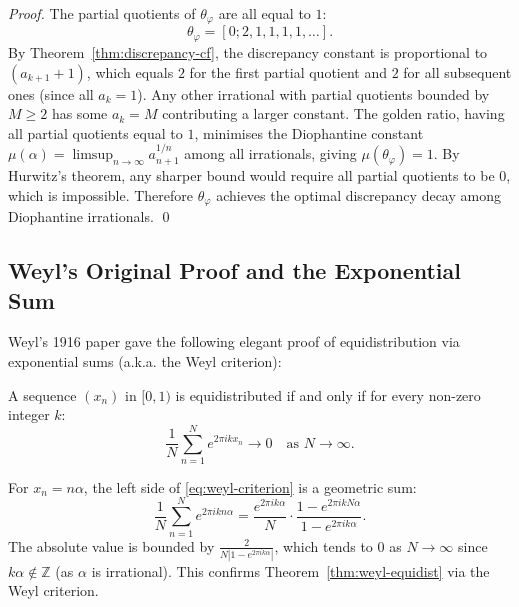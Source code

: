 \begin{proof}
The partial quotients of $\theta_\varphi$ are all equal to $1$:
\begin{equation}
  \theta_\varphi = [0;2,1,1,1,1,\ldots].
\end{equation}
By Theorem~\ref{thm:discrepancy-cf}, the discrepancy constant is proportional to
$(a_{k+1}+1)$, which equals $2$ for the first partial quotient and $2$ for all subsequent ones
(since all $a_k = 1$).
Any other irrational with partial quotients bounded by $M \ge 2$ has some $a_k = M$
contributing a larger constant.
The golden ratio, having all partial quotients equal to $1$, minimises the Diophantine
constant $\mu(\alpha) = \limsup_{n\to\infty} a_{n+1}^{1/n}$ among all irrationals,
giving $\mu(\theta_\varphi) = 1$.
By Hurwitz's theorem, any sharper bound would require all partial quotients to be $0$,
which is impossible.
Therefore $\theta_\varphi$ achieves the optimal discrepancy decay among Diophantine irrationals.
\qed
\end{proof}

\subsection{Weyl's Original Proof and the Exponential Sum}\label{subsec:ch18-weyl-original}

Weyl's 1916 paper \cite{Weyl1916} gave the following elegant proof of
equidistribution via exponential sums (a.k.a. the Weyl criterion):

\begin{lemma}\label{lem:weyl-criterion}
A sequence $(x_n)$ in $[0,1)$ is equidistributed if and only if for every
non-zero integer $k$:
\begin{equation}\label{eq:weyl-criterion}
  \frac{1}{N}\sum_{n=1}^{N} e^{2\pi ikx_n} \to 0 \quad\text{as } N\to\infty.
\end{equation}
\end{lemma}

For $x_n = n\alpha$, the left side of \eqref{eq:weyl-criterion} is a geometric
sum:
\begin{equation}\label{eq:geometric-sum}
  \frac{1}{N}\sum_{n=1}^N e^{2\pi ikn\alpha}
  = \frac{e^{2\pi ik\alpha}}{N} \cdot \frac{1 - e^{2\pi ikN\alpha}}{1 - e^{2\pi ik\alpha}}.
\end{equation}
The absolute value is bounded by $\frac{2}{N|1 - e^{2\pi ik\alpha}|}$, which
tends to $0$ as $N \to \infty$ since $k\alpha \notin \mathbb{Z}$ (as $\alpha$ is irrational).
This confirms Theorem~\ref{thm:weyl-equidist} via the Weyl criterion.

